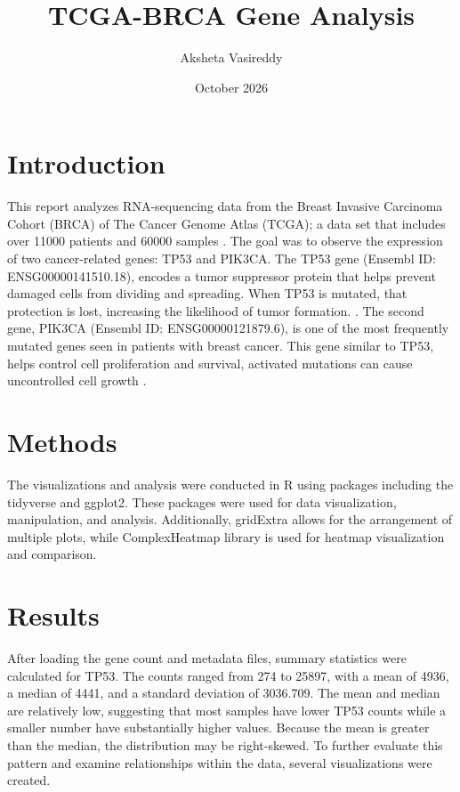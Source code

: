 \documentclass{article}
\title{TCGA-BRCA Gene Analysis}
\author{Aksheta Vasireddy}
\date{October 2026}
\begin{document}
\maketitle

\section{Introduction}
This report analyzes RNA-sequencing data from the Breast Invasive Carcinoma Cohort (BRCA) of The Cancer Genome Atlas (TCGA); a data set that includes over 11000 patients and 60000 samples \cite{NIH}. The goal was to observe the expression of two cancer-related genes: TP53 and PIK3CA. 
The TP53 gene (Ensembl ID: ENSG00000141510.18), encodes a tumor suppressor protein that helps prevent damaged cells from dividing and spreading. When TP53 is mutated, that protection is lost, increasing the likelihood of tumor formation. \cite{ensemblEnsembl}\cite{medlineplusTP53Gene}. 
The second gene, PIK3CA (Ensembl ID: ENSG00000121879.6), is one of the most frequently mutated genes seen in patients with breast cancer. This gene similar to TP53, helps control cell proliferation and survival, activated mutations can cause uncontrolled cell growth \cite{ensemblEnsembl}\cite{medlineplusPIK3CAGene}.

\section{Methods}
The visualizations and analysis were conducted in R using packages including the tidyverse and ggplot2. These packages were used for data visualization, manipulation, and analysis. Additionally, gridExtra allows for the arrangement of multiple plots, while ComplexHeatmap library is used for heatmap visualization and comparison.

\section{Results}
After loading the gene count and metadata files, summary statistics were calculated for TP53. The counts ranged from 274 to 25897, with a mean of 4936, a median of 4441, and a standard deviation of 3036.709. The mean and median are relatively low, suggesting that most samples have lower TP53 counts while a smaller number have substantially higher values. Because the mean is greater than the median, the distribution may be right-skewed. To further evaluate this pattern and examine relationships within the data, several visualizations were created.
\end{document}
